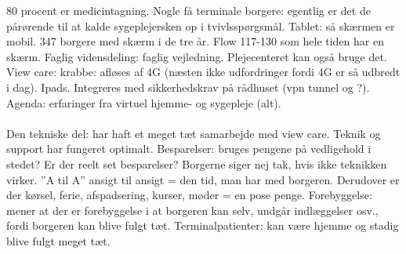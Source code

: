 80 procent er medicintagning. 
Nogle få terminale borgere: egentlig er det de pårørende til at kalde sygeplejersken op i tvivlsspørgsmål. Tablet: så skærmen er mobil. 
347 borgere med skærm i de tre år. 
Flow 117-130 som hele tiden har en skærm. 
Faglig vidensdeling: faglig vejledning. Plejecenteret kan også bruge det. 
View care: krabbe: afløses af 4G (næsten ikke udfordringer fordi 4G er så udbredt i dag). 
Ipads. 
Integreres med sikkerhedskrav på rådhuset (vpn tunnel og ?). 
Agenda: erfaringer fra virtuel hjemme- og sygepleje (alt). 
\\ \\
Den tekniske del: har haft et meget tæt samarbejde med view care. Teknik og support har fungeret optimalt. 
Besparelser: bruges pengene på vedligehold i stedet? Er der reelt set besparelser? 
Borgerne siger nej tak, hvis ikke teknikken virker.  
”A til A” ansigt til ansigt = den tid, man har med borgeren. 
Derudover er der kørsel, ferie, afspadsering, kurser, møder = en pose penge.
Forebyggelse: mener at der er forebyggelse i at borgeren kan selv, undgår indlæggelser osv., fordi borgeren kan blive fulgt tæt.
Terminalpatienter: kan være hjemme og stadig blive fulgt meget tæt. 
